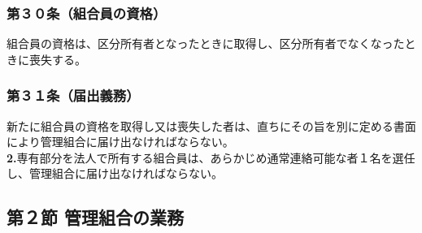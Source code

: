 \documentclass[12pt,uplatex]{jsarticle}
\begin{document}
\subsubsection*{第３０条（組合員の資格）}
組合員の資格は、区分所有者となったときに取得し、区分所有者でなくなったときに喪失する。
\subsubsection*{第３１条（届出義務）}
新たに組合員の資格を取得し又は喪失した者は、直ちにその旨を別に定める書面により管理組合に届け出なければならない。\\
\textbf{2.}専有部分を法人で所有する組合員は、あらかじめ通常連絡可能な者１名を選任し、管理組合に届け出なければならない。

\begin{center}
\subsection*{第２節 管理組合の業務}
\end{center}
\end{document}
